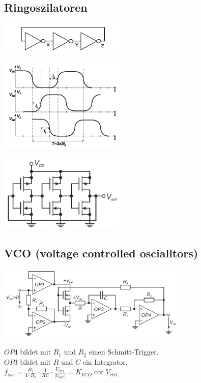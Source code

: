 \subsection{Ringoszilatoren}
	\begin{multicols}{3}
	 	\includegraphics[width=6cm]{images/osziRing.png}	
		\columnbreak
		
		\includegraphics[width=6cm]{images/osziRingSignal.png}	
		\columnbreak
		
		\includegraphics[width=6cm]{images/osziRingCMOS.png}
	\end{multicols}
\subsection{VCO (voltage controlled oscialltors)}
	\begin{multicols}{2}
		\includegraphics[width=9cm]{images/osciVCO.png}
		\columnbreak
		
		$OP4$ bildet mit $R_1$ und $R_2$ einen Schmitt-Trigger.\\
		$OP3$ bildet mit $R$ und $C$ ein Integrator.\\
		$f_{osc}=\frac{R_2}{4\cdot R_1}\cdot \frac{1}{RC}\cdot
		\frac{V_{ctrl}}{\left|V_{out}\right|}=K_{VCO}\cot V_{ctrl}$\\
	\end{multicols}
